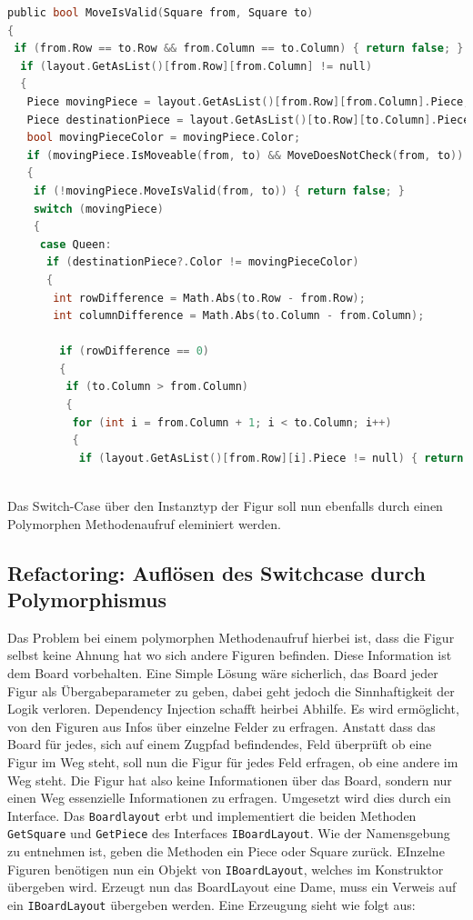 \documentclass[
10pt, %
a4paper, %
oneside, %
headinclude,footinclude, %
BCOR5mm, %
]{scrartcl}
\begin{document}
	\begin{lstlisting}[language=c, style=mStyle]
public bool MoveIsValid(Square from, Square to)
{
 if (from.Row == to.Row && from.Column == to.Column) { return false; }
  if (layout.GetAsList()[from.Row][from.Column] != null)
  {
   Piece movingPiece = layout.GetAsList()[from.Row][from.Column].Piece;
   Piece destinationPiece = layout.GetAsList()[to.Row][to.Column].Piece;
   bool movingPieceColor = movingPiece.Color;
   if (movingPiece.IsMoveable(from, to) && MoveDoesNotCheck(from, to))
   {
	if (!movingPiece.MoveIsValid(from, to)) { return false; }
	switch (movingPiece)
	{
	 case Queen:
	  if (destinationPiece?.Color != movingPieceColor)
	  {
	   int rowDifference = Math.Abs(to.Row - from.Row);
	   int columnDifference = Math.Abs(to.Column - from.Column);

	    if (rowDifference == 0)
		{
		 if (to.Column > from.Column)
		 {
		  for (int i = from.Column + 1; i < to.Column; i++)
		  {
		   if (layout.GetAsList()[from.Row][i].Piece != null) { return false; }
		  
	\end{lstlisting}

	Das Switch-Case über den Instanztyp der Figur soll nun ebenfalls durch einen Polymorphen Methodenaufruf eleminiert werden. 

	\subsection{Refactoring: Auflösen des Switchcase durch Polymorphismus}
	Das Problem bei einem polymorphen Methodenaufruf hierbei ist, dass die Figur selbst keine Ahnung hat wo sich andere Figuren befinden. Diese Information ist dem Board vorbehalten. Eine Simple Lösung wäre sicherlich, das Board jeder Figur als Übergabeparameter zu geben, dabei geht jedoch die Sinnhaftigkeit der Logik verloren. Dependency Injection schafft heirbei Abhilfe. Es wird ermöglicht, von den Figuren aus Infos über einzelne Felder zu erfragen. Anstatt dass das Board für jedes, sich auf einem Zugpfad befindendes, Feld überprüft ob eine Figur im Weg steht, soll nun die Figur für jedes Feld erfragen, ob eine andere im Weg steht. Die Figur hat also keine Informationen über das Board, sondern nur einen Weg essenzielle Informationen zu erfragen. Umgesetzt wird dies durch ein Interface. Das \texttt{Boardlayout} erbt und implementiert die beiden Methoden \texttt{GetSquare} und \texttt{GetPiece} des Interfaces \texttt{IBoardLayout}. Wie der Namensgebung zu entnehmen ist, geben die Methoden ein Piece oder Square zurück. EInzelne Figuren benötigen nun ein Objekt von \texttt{IBoardLayout}, welches im Konstruktor übergeben wird. Erzeugt nun das BoardLayout eine Dame, muss ein Verweis auf ein \texttt{IBoardLayout} übergeben werden. Eine Erzeugung sieht wie folgt aus:
\end{document}
